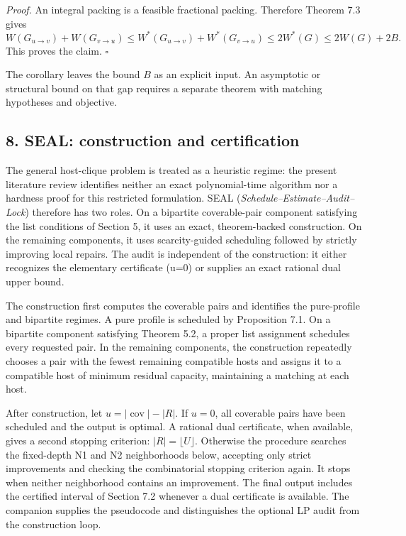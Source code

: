 \documentclass[english,11pt,a4paper]{article}
\begin{document}
\emph{Proof.} An integral packing is a feasible fractional packing.
Therefore Theorem 7.3 gives \[
W(G_{u\to v})+W(G_{v\to u})
\le W^*(G_{u\to v})+W^*(G_{v\to u})
\le2W^*(G)\le2W(G)+2B.
\] This proves the claim. \(\square\)

The corollary leaves the bound \(B\) as an explicit input. An asymptotic
or structural bound on that gap requires a separate theorem with
matching hypotheses and objective.

\subsection{8. SEAL: construction and
certification}\label{seal-construction-and-certification}

The general host-clique problem is treated as a heuristic regime: the
present literature review identifies neither an exact polynomial-time
algorithm nor a hardness proof for this restricted formulation. SEAL
(\emph{Schedule--Estimate--Audit--Lock}) therefore has two roles. On a
bipartite coverable-pair component satisfying the list conditions of
Section 5, it uses an exact, theorem-backed construction. On the
remaining components, it uses scarcity-guided scheduling followed by
strictly improving local repairs. The audit is independent of the
construction: it either recognizes the elementary certificate (u=0) or
supplies an exact rational dual upper bound.

The construction first computes the coverable pairs and identifies the
pure-profile and bipartite regimes. A pure profile is scheduled by
Proposition 7.1. On a bipartite component satisfying Theorem 5.2, a
proper list assignment schedules every requested pair. In the remaining
components, the construction repeatedly chooses a pair with the fewest
remaining compatible hosts and assigns it to a compatible host of
minimum residual capacity, maintaining a matching at each host.

After construction, let \(u=|\operatorname{cov}|-|R|\). If \(u=0\), all
coverable pairs have been scheduled and the output is optimal. A
rational dual certificate, when available, gives a second stopping
criterion: \(|R|=\lfloor U\rfloor\). Otherwise the procedure searches
the fixed-depth N1 and N2 neighborhoods below, accepting only strict
improvements and checking the combinatorial stopping criterion again. It
stops when neither neighborhood contains an improvement. The final
output includes the certified interval of Section 7.2 whenever a dual
certificate is available. The companion supplies the pseudocode and
distinguishes the optional LP audit from the construction loop.
\end{document}
